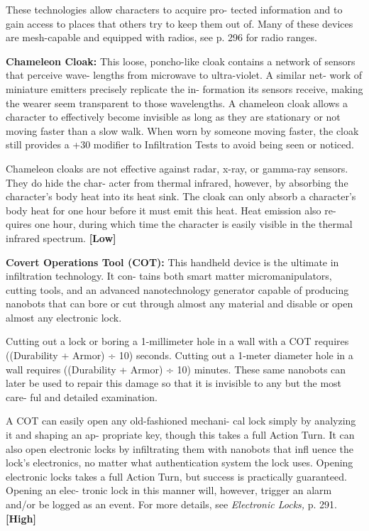 These technologies allow characters to acquire pro-
tected information and to gain access to places that 
others try to keep them out of. Many of these devices 
are mesh-capable and equipped with radios, see p. 296 
for radio ranges.

\textbf{Chameleon Cloak: }This loose, poncho-like cloak 
contains a network of sensors that perceive wave-
lengths from microwave to ultra-violet. A similar net-
work of miniature emitters precisely replicate the in-
formation its sensors receive, making the wearer seem 
transparent to those wavelengths. A chameleon cloak 
allows a character to effectively become invisible as 
long as they are stationary or not moving faster than 
a slow walk. When worn by someone moving faster, 
the cloak still provides a +30 modifier to Infiltration 
Tests to avoid being seen or noticed.

Chameleon cloaks are not effective against radar, 
x-ray, or gamma-ray sensors. They do hide the char-
acter from thermal infrared, however, by absorbing 
the character's body heat into its heat sink. The cloak 
can only absorb a character's body heat for one hour 
before it must emit this heat. Heat emission also re-
quires one hour, during which time the character is 
easily visible in the thermal infrared spectrum. \textbf{[Low]}

\textbf{Covert Operations Tool (COT): }This handheld 
device is the ultimate in infiltration technology. It con-
tains both smart matter micromanipulators, cutting 
tools, and an advanced nanotechnology generator 
capable of producing nanobots that can bore or cut 
through almost any material and disable or open 
almost any electronic lock.

Cutting out a lock or boring a 1-millimeter hole in 
a wall with a COT requires ((Durability + Armor) ÷ 
10) seconds. Cutting out a 1-meter diameter hole in 
a wall requires ((Durability + Armor) ÷ 10) minutes. 
These same nanobots can later be used to repair this 
damage so that it is invisible to any but the most care-
ful and detailed examination.

A COT can easily open any old-fashioned mechani-
cal lock simply by analyzing it and shaping an ap-
propriate key, though this takes a full Action Turn. 
It can also open electronic locks by infiltrating them 
with nanobots that infl uence the lock's electronics, 
no matter what authentication system the lock uses. 
Opening electronic locks takes a full Action Turn, but 
success is practically guaranteed. Opening an elec-
tronic lock in this manner will, however, trigger an 
alarm and/or be logged as an event. For more details, 
see \textit{Electronic Locks,} p. 291. \textbf{[High]}

